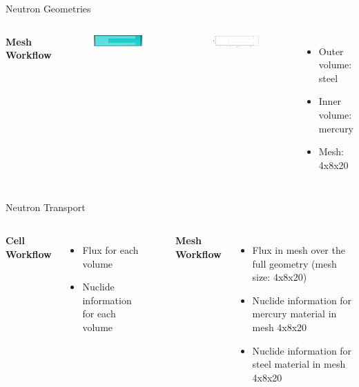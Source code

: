 \documentclass{beamer}
\begin{document}
\begin{frame}{Neutron Geometries}
\begin{columns}[T]
	\textbf{Mesh Workflow}
                \begin{figure}
                        \centering
                        \includegraphics[scale=0.12]{figs/box_target_trelis.png}
                \end{figure}
                \begin{figure}
                        \centering
                        \includegraphics[scale=0.11]{figs/box_target_nograveyard.png}
                \end{figure}
	\begin{itemize}
		\item{Outer volume: steel}
		\item{Inner volume: mercury}
		\item{Mesh: 4x8x20}
	\end{itemize}
\end{columns}
\end{frame}

\begin{frame}{Neutron Transport}
\begin{columns}[T]
	\textbf{Cell Workflow}
	\begin{itemize}[<+->]
		\item<2->{Flux for each volume}
		\item<3->{Nuclide information for each volume}
	\end{itemize}

        \rule{.1mm}{.7\textheight}

	\textbf{Mesh Workflow}
	\begin{itemize}[<+->]
		\item<2->{Flux in mesh over the full geometry (mesh size: 4x8x20)}
		\item<3->{Nuclide information for mercury material in mesh 4x8x20}
		\item<4->{Nuclide information for steel material in mesh 4x8x20}
	\end{itemize}
\end{columns}
\end{frame}
\end{document}

